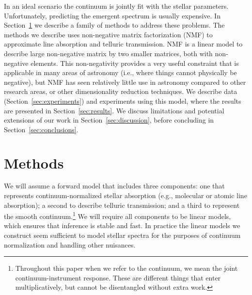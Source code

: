 \documentclass[modern]{aastex631}
\begin{document}
In an ideal scenario the continuum is jointly fit with the stellar parameters. Unfortunately, predicting the emergent spectrum is usually expensive. In Section~\ref{sec:methods} we describe a family of methods to address these problems.
The methods we describe uses non-negative matrix factorization (NMF) to approximate line absorption and telluric transmission. NMF is a linear model to describe large non-negative matrix by two smaller matrices, both with non-negative elements. This non-negativity provides a very useful constraint that is applicable in many areas of astronomy (i.e., where things cannot physically be negative), but NMF has seen relatively little use in astronomy compared to other research areas, or other dimensionality reduction techniques. 
We describe data (Section~\ref{sec:experiments}) and experiments using this model, where the results are presented in Section~\ref{sec:results}. We discuss limitations and potential extensions of our work in Section~\ref{sec:discussion}, before concluding in Section~\ref{sec:conclusions}.\\



\section{Methods}\label{sec:methods}

We will assume a forward model that includes three components: one that represents continuum-normalized stellar absorption (e.g., molecular or atomic line absorption); a second to describe telluric transmission; and a third to represent the smooth continuum.\footnote{Throughout this paper when we refer to the continuum, we mean the joint continuum-instrument response. These are different things that enter multiplicatively, but cannot be disentangled without extra work.} We will require all components to be linear models, which ensures that inference is stable and fast. In practice the linear models we construct seem sufficient to model stellar spectra for the purposes of continuum normalization and handling other nuisances.\\
\end{document}
